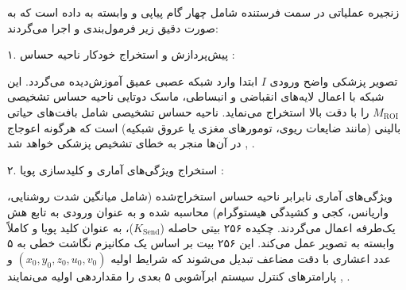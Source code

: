 




زنجیره عملیاتی در سمت فرستنده شامل چهار گام پیاپی و وابسته به داده است که به صورت دقیق زیر فرمول‌بندی و اجرا می‌گردند:\par



۱. پیش‌پردازش و استخراج خودکار ناحیه حساس :\par

تصویر پزشکی واضح ورودی $I$ ابتدا وارد شبکه عصبی عمیق  آموزش‌دیده می‌گردد. این شبکه با اعمال لایه‌های انقباضی و انبساطی، ماسک دوتایی ناحیه حساس تشخیصی $M_{\mathrm{ROI}}$ را با دقت بالا استخراج می‌نماید. ناحیه حساس تشخیصی شامل بافت‌های حیاتی بالینی (مانند ضایعات ریوی، تومورهای مغزی یا عروق شبکیه) است که هرگونه اعوجاج در آن‌ها منجر به خطای تشخیص پزشکی خواهد شد , .\par



۲. استخراج ویژگی‌های آماری و کلیدسازی پویا :\par

ویژگی‌های آماری نابرابر ناحیه حساس استخراج‌شده (شامل میانگین شدت روشنایی، واریانس، کجی و کشیدگی هیستوگرام) محاسبه شده و به عنوان ورودی به تابع هش یک‌طرفه  اعمال می‌گردند. چکیده ۲۵۶ بیتی حاصله ($K_{\mathrm{Send}}$)، به عنوان کلید پویا و کاملاً وابسته به تصویر عمل می‌کند. این ۲۵۶ بیت بر اساس یک مکانیزم نگاشت خطی به ۵ عدد اعشاری با دقت مضاعف تبدیل می‌شوند که شرایط اولیه $(x_0,\allowbreak{} y_0,\allowbreak{} z_0,\allowbreak{} u_0,\allowbreak{} v_0)$ و پارامترهای کنترل سیستم ابرآشوبی ۵ بعدی را مقداردهی اولیه می‌نمایند , .\par



